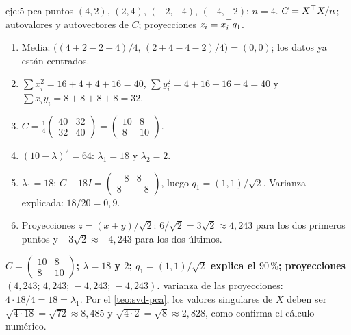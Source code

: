 \begin{solucion}{eje:5-pca}
\datos puntos $(4,2)$, $(2,4)$, $(-2,-4)$, $(-4,-2)$; $n=4$.
\planteamiento $C=X^{\top} X/n$; autovalores y autovectores de $C$; proyecciones $z_i=x_i^{\top} q_1$.
\pasos
\begin{enumerate}[label=\arabic*.]
  \item Media: $\bigl((4+2-2-4)/4,\,(2+4-4-2)/4\bigr)=(0,0)$; los datos ya están centrados.
  \item $\sum x_i^{2}=16+4+4+16=40$, $\sum y_i^{2}=4+16+16+4=40$ y $\sum x_iy_i=8+8+8+8=32$.
  \item $C=\frac14\begin{pmatrix}40&32\\32&40\end{pmatrix}=\begin{pmatrix}10&8\\8&10\end{pmatrix}$.
  \item $(10-\lambda)^{2}=64$: $\lambda_1=18$ y $\lambda_2=2$.
  \item $\lambda_1=18$: $C-18I=\begin{pmatrix}-8&8\\8&-8\end{pmatrix}$, luego $q_1=(1,1)/\sqrt{2}$. Varianza explicada: $18/20=0{,}9$.
  \item Proyecciones $z=(x+y)/\sqrt{2}$: $6/\sqrt{2}=3\sqrt{2}\approx 4{,}243$ para los dos primeros puntos y $-3\sqrt{2}\approx -4{,}243$ para los dos últimos.
\end{enumerate}
\resultado \textbf{$C=\begin{pmatrix}10&8\\8&10\end{pmatrix}$; $\lambda=18$ y $2$; $q_1=(1,1)/\sqrt{2}$ explica el $90\,\%$; proyecciones $(4{,}243;\,4{,}243;\,-4{,}243;\,-4{,}243)$.}
\comprobacion varianza de las proyecciones: $4\cdot 18/4=18=\lambda_1$. Por el \cref{teo:svd-pca}, los valores singulares de $X$ deben ser $\sqrt{4\cdot 18}=\sqrt{72}\approx 8{,}485$ y $\sqrt{4\cdot 2}=\sqrt{8}\approx 2{,}828$, como confirma el cálculo numérico.
\end{solucion}

